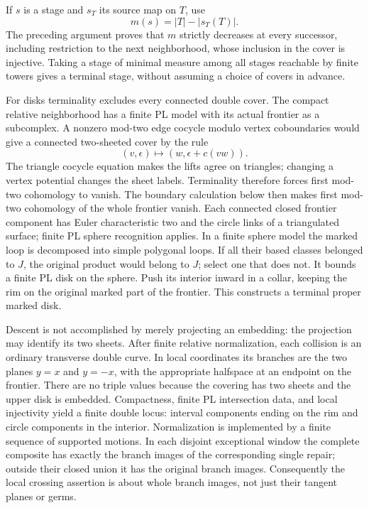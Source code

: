 If $s$ is a stage and $s_T$ its source map on $T$, use
\[
                    m(s)=|T|-|s_T(T)|.
\]
The preceding argument proves that $m$ strictly decreases at every
successor, including restriction to the next neighborhood, whose
inclusion in the cover is injective.  Taking a stage
of minimal measure among all stages reachable by finite towers gives a terminal
stage, without assuming a choice of covers in advance.

For disks terminality excludes every connected double cover.  The
compact relative neighborhood has a finite PL model with its actual
frontier as a subcomplex.  A nonzero mod-two edge cocycle modulo vertex
coboundaries would give a connected two-sheeted cover by the rule
\[
       (v,\epsilon)\longmapsto(w,\epsilon+c(vw)).
\]
The triangle cocycle equation makes the lifts agree on triangles;
changing a vertex potential changes the sheet labels.  Terminality
therefore forces first mod-two cohomology to vanish.  The boundary
calculation below then makes first mod-two cohomology of the whole
frontier vanish.  Each connected closed frontier component has
Euler characteristic two and the circle links of a triangulated
surface; finite PL sphere recognition applies.
In a finite sphere model the marked loop is decomposed into simple
polygonal loops.  If all their based classes belonged to $J$, the
original product would belong to $J$; select one that does not.
It bounds a finite PL disk on the sphere.  Push its interior inward in
a collar, keeping the rim on the original marked part of the frontier.
This constructs a terminal proper marked disk.

Descent is not accomplished by merely projecting an embedding: the
projection may identify its two sheets.  After finite relative
normalization, each collision is an ordinary transverse double curve.
In local coordinates its branches are the two planes
$y=x$ and $y=-x$, with the appropriate halfspace at an endpoint on
the frontier.  There are no triple values because the covering has
two sheets and the upper disk is embedded.  Compactness, finite PL
intersection data, and local injectivity yield a finite double locus:
interval components ending on the rim and circle components in the
interior.  Normalization is implemented by a finite sequence of
supported motions.  In each disjoint exceptional window the complete
composite has exactly the branch images of the corresponding single
repair; outside their closed union it has the original branch images.
Consequently the local crossing assertion is about whole branch
images, not just their tangent planes or germs.

